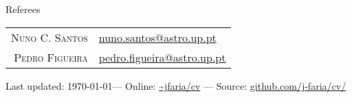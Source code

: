 \documentclass[10pt]{article}
\begin{document}
\fi


\ifreferees

\vspace{5in}
{\Large\scshape\raggedright\sffamily Referees}
\newcommand{\service}[2]{
  \textsc{#1} & #2\\[1em]
}
\begin{longtable}{r|p{10cm}}
  \service{Nuno C. Santos}{\href{mailto:nuno.santos@astro.up.pt}{nuno.santos@astro.up.pt}}
  \service{Pedro Figueira}{\href{mailto:pedro.figueira@astro.up.pt}{pedro.figueira@astro.up.pt}}
\end{longtable}

\fi

\null\vfill
\footnotesize{
  Last updated: \today \quad---\quad
  Online:  \href{http://j-faria.github.io/cv}{\textasciitilde jfaria/cv} \quad---\quad
  Source:  \href{https://github.com/j-faria/cv}{github.com/j-faria/cv/}
}
\end{document}
